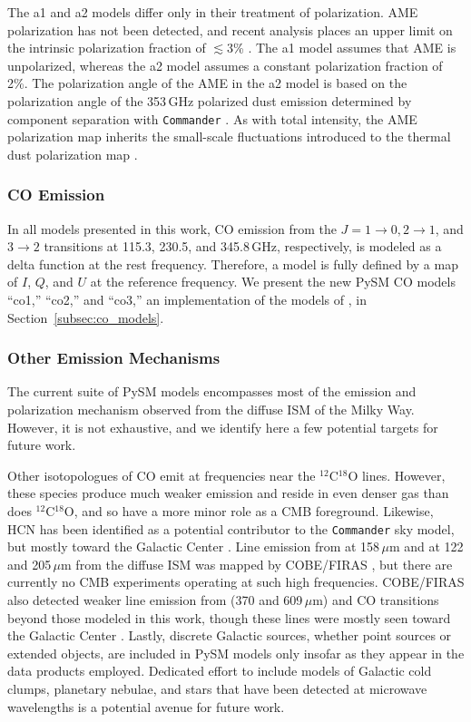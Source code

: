 \documentclass[twocolumn]{aastex631}
\begin{document}
The a1 and a2 models differ only in their treatment of polarization. AME polarization has not been detected, and recent analysis places an upper limit on the intrinsic polarization fraction of $\lesssim3$\% \citep{Herman:2023}. The a1 model assumes that AME is unpolarized, whereas the a2 model assumes a constant polarization fraction of 2\%. The polarization angle of the AME in the a2 model is based on the polarization angle of the 353\,GHz polarized dust emission determined by component separation with \texttt{Commander} \citep{planck2014-a12}. As with total intensity, the AME polarization map inherits the small-scale fluctuations introduced to the thermal dust polarization map \citep[see][for details]{Thorne:2017}.

\subsubsection{CO Emission}
In all models presented in this work, CO emission from the $J = 1\rightarrow0, 2\rightarrow1$, and $3\rightarrow2$ transitions at 115.3, 230.5, and 345.8\,GHz, respectively, is modeled as a delta function at the rest frequency. Therefore, a model is fully defined by a map of $I$, $Q$, and $U$ at the reference frequency. We present the new PySM CO models ``co1,'' ``co2,'' and ``co3,'' an implementation of the models of \citet{Puglisi:2017}, in Section~\ref{subsec:co_models}.

\subsubsection{Other Emission Mechanisms} %
The current suite of PySM models encompasses most of the emission and polarization mechanism observed from the diffuse ISM of the Milky Way. However, it is not exhaustive, and we identify here a few potential targets for future work.

Other isotopologues of CO emit at frequencies near the $^{12}$C$^{18}$O lines. However, these species produce much weaker emission and reside in even denser gas than does $^{12}$C$^{18}$O, and so have a more minor role as a CMB foreground. Likewise, HCN has been identified as a potential contributor to the \texttt{Commander} sky model, but mostly toward the Galactic Center \citep{planck2014-a12}. Line emission from  at 158\,$\mu$m and  at 122 and 205\,$\mu$m from the diffuse ISM was mapped by COBE/FIRAS \citep{Bennett:1994}, but there are currently no CMB experiments operating at such high frequencies. COBE/FIRAS also detected weaker line emission from  (370 and 609\,$\mu$m) and CO transitions beyond those modeled in this work, though these lines were mostly seen toward the Galactic Center \citep{Bennett:1994}. Lastly, discrete Galactic sources, whether point sources or extended objects, are included in PySM models only insofar as they appear in the data products employed. Dedicated effort to include models of Galactic cold clumps, planetary nebulae, and stars that have been detected at microwave wavelengths is a potential avenue for future work. 
\end{document}
